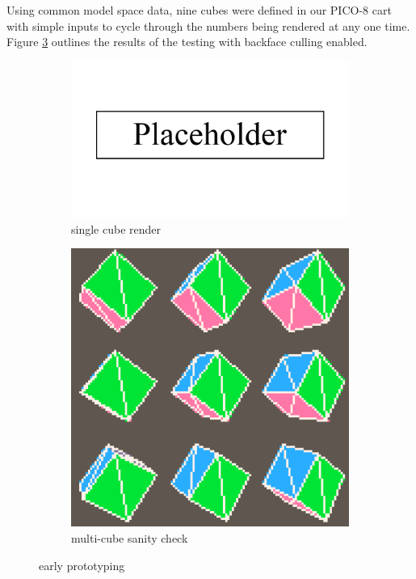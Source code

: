 \documentclass[11pt]{article}
\begin{document}
Using common model space data, nine cubes were defined in our PICO-8 cart with simple inputs
to cycle through the numbers being rendered at any one time. Figure \ref{fig:3dprototype}
outlines the results of the testing with backface culling enabled.


\begin{figure}[h]
\begin{subfigure}{.5\textwidth}
  \centering
  \includegraphics[width=.8\linewidth]{placeholder}
  \caption{single cube render}
  \label{fig:3dfig1}
\end{subfigure}
\begin{subfigure}{.5\textwidth}
  \centering
  \includegraphics[width=.8\linewidth]{test3d}
  \caption{multi-cube sanity check}
  \label{fig:3dfig2}
\end{subfigure}
\caption{early prototyping}
\label{fig:3dprototype}
\end{figure}
\end{document}
